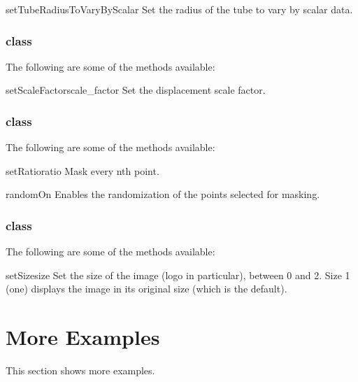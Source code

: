 \begin{methoddesc}[Tube]{setTubeRadiusToVaryByScalar}{}
Set the radius of the tube to vary by scalar data.
\end{methoddesc}

\subsubsection{\Warp class}

The following are some of the methods available:

\begin{methoddesc}[Warp]{setScaleFactor}{scale_factor}
Set the displacement scale factor.
\end{methoddesc}

\subsubsection{\MaskPoints class}

The following are some of the methods available:

\begin{methoddesc}[MaskPoints]{setRatio}{ratio}
Mask every nth point.
\end{methoddesc}

\begin{methoddesc}[MaskPoints]{randomOn}{}
Enables the randomization of the points selected for masking.
\end{methoddesc}

\subsubsection{\ImageReslice class}

The following are some of the methods available:

\begin{methoddesc}[ImageReslice]{setSize}{size}
Set the size of the image (logo in particular), between 0 and 2. Size 1 (one) 
displays the image in its original size (which is the default).
\end{methoddesc}




\section{More Examples}
This section shows more examples.

